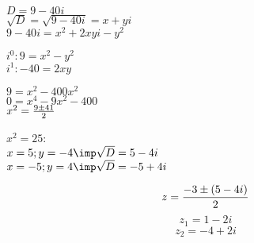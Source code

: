 $ D = 9-40i$\\
$\sqrt D = \sqrt{9-40i} = x+yi$\\
$9-40i = x^2 + 2xyi - y^2$

$i^0: 9 = x^2-y^2$\\
$i^1: -40=2xy$

$9 = x^2 - {400}{x^2}$\\
$0 = x^4 -9x^2-400$\\
$x^2 = \frac{9\pm 41}2$

$x^2 = 25$:\\
$x=5; y=-4 \imp \sqrt D = 5-4i$\\
$x=-5; y=4 \imp \sqrt D = -5+4i$

$$z = \frac{-3\pm(5-4i)}2$$
$$z_1 = 1-2i$$
$$z_2 = -4+2i$$


\EndDoc
